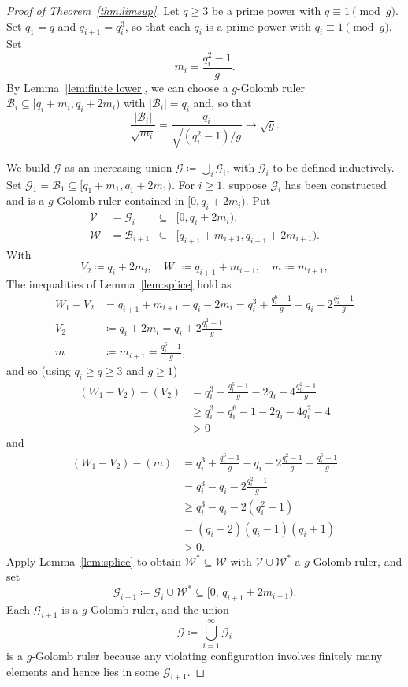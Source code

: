 \documentclass[10pt]{article}
\newcommand{\cG}{\mathcal{G}}
\newcommand{\cV}{\mathcal{V}}
\newcommand{\cW}{\mathcal{W}}
\newcommand{\cB}{\mathcal{B}}
\begin{document}
\begin{proof}[Proof of Theorem~\ref{thm:limsup}]
Let $q\ge 3$ be a prime power with $q\equiv 1 \pmod{g }$. Set $q_1=q$ and $q_{i+1} = q_i^3$, so that each $q_i$ is a prime power with $q_i \equiv 1 \pmod{g }$. Set
\begin{equation*}
  m_i = \frac{q_i^2 - 1}{g }.
\end{equation*}
By Lemma~\ref{lem:finite lower}, we can choose a $g$-Golomb ruler $\cB_i \subseteq
[q_i+m_i, q_i+2m_i)$ with $|\cB_i| = q_i$ and, so that
\begin{equation*}
  \frac{|\cB_i|}{\sqrt{m_i}}
    = \frac{q_i}{\sqrt{(q_i^2 - 1)/g }}
    \longrightarrow \sqrt{g }.
\end{equation*}

We build $\cG$ as an increasing union $\cG \coloneqq \bigcup_i \cG_i$, with $\cG_i$ to be defined inductively.
Set $\cG_1 = \cB_1 \subseteq [q_1+m_1, q_1+2m_1)$. For $i \ge 1$,
suppose $\cG_i$ has been constructed and is a $g$-Golomb ruler
contained in $[0, q_i+ 2m_i)$. Put
\begin{align*}
  \cV &= \cG_i &\subseteq &[0,q_i+ 2m_i), \\
  \cW &= \cB_{i+1} &\subseteq &[q_{i+1}+m_{i+1}, q_{i+1}+2m_{i+1}).
\end{align*}
With 
  \[ V_2 \coloneqq q_i+2m_i,\quad  W_1 \coloneqq q_{i+1}+m_{i+1}, \quad m \coloneqq m_{i+1},\]
The inequalities of Lemma~\ref{lem:splice} hold as 
\begin{align*}
  W_1 - V_2 &=q_{i+1}+m_{i+1}-q_i-2m_{i} =q_i^3+ \frac{q_i^6-1}{g }-q_i -2\frac{q_i^2-1}{g }\\
  V_2 &\coloneqq q_i+2m_i = q_i + 2\frac{q_i^2-1}{g }\\
  m &\coloneqq m_{i+1} = \frac{q_i^6-1}{g },
\end{align*}
and so (using $q_i \ge q \ge 3$ and $g \ge 1$)
  \begin{align*}
     (W_1-V_2)-(V_2) 
     &= q_i^3+ \frac{q_i^6-1}{g }-2q_i -4\frac{q_i^2-1}{g } \\
     &\ge q_i^3+ q_i^6-1-2q_i -4q_i^2-4 \\
     &> 0
  \end{align*}
and
  \begin{align*}
    (W_1-V_2)-(m)
    &=q_i^3+ \frac{q_i^6-1}{g }-q_i -2\frac{q_i^2-1}{g }-\frac{q_i^6-1}{g } \\
    &=  q_i^3-q_i -2\frac{q_i^2-1}{g } \\
    &\ge  q_i^3-q_i -2(q_i^2-1) \\
    &=(q_i-2)(q_i-1)(q_i+1) \\
    &>0.
  \end{align*}
Apply Lemma~\ref{lem:splice} to obtain $\cW^{*} \subseteq \cW$ with
$\cV \cup \cW^{*}$ a $g$-Golomb ruler, and set
\begin{equation*}
  \cG_{i+1} \coloneqq \cG_i \cup \cW^{*} 
    \subseteq [0,\, q_{i+1}+2m_{i+1}).
\end{equation*}
Each $\cG_{i+1}$ is a $g$-Golomb ruler, and the union
  \[\cG \coloneqq \bigcup_{i=1}^\infty \cG_i\] 
is a $g$-Golomb ruler because any violating configuration involves finitely many elements and hence lies in some $\cG_{i+1}$.


\end{proof}
\end{document}
